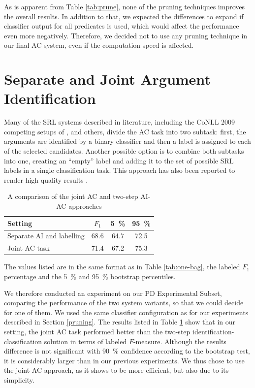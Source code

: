 \documentclass[12pt,notitlepage,a4paper]{report}
\begin{document}
As is apparent from Table \ref{tab:prune}, none of the pruning techniques improves the overall results. In addition to that, we expected the differences to expand if classifier output for all predicates is used, which would affect the performance even more negatively. Therefore, we decided not to use any pruning technique in our final AC system, even if the computation speed is affected.

\section{Separate and Joint Argument Identification}\label{ai-ac}

Many of the SRL systems described in literature, including the CoNLL 2009 competing setups of \citet{chen09}, \citet{bohnet09} and others, divide the AC task into two subtask: first, the arguments are identified by a binary classifier and then a label is assigned to each of the selected candidates. Another possible option is to combine both subtasks into one, creating an ``empty'' label and adding it to the set of possible SRL labels in a single classification task. This approach has also been reported to render high quality results \citep{che09,asahara09}.

\begin{table}[htb]\label{tab:ai-ac}
\caption{A comparison of the joint AC and two-step AI-AC approaches}\footnotesize
\begin{center}
\begin{tabular}{|l|c|c|c|}\hline
\bf Setting & $F_1$ & \bf 5~\% & \bf 95~\% \\\hline
Separate AI and labelling & 68.6 & 64.7 & 72.5 \\
Joint AC task & 71.4 & 67.2 & 75.3 \\\hline
\end{tabular}
\end{center}
The values listed are in the same format as in Table \ref{tab:one-bag}, the labeled $F_1$ percentage and the 5~\% and 95~\% bootstrap percentiles.
\end{table}

We therefore conducted an experiment on our PD Experimental Subset, comparing the performance of the two system variants, so that we could decide for one of them. We used the same classifier configuration as for our experiments described in Section \ref{pruning}. The results listed in Table \ref{tab:ai-ac} show that in our setting, the joint AC task performed better than the two-step identification-classification solution in terms of labeled $F$-measure. Although the results difference is not significant with 90~\% confidence according to the bootstrap test, it is considerably larger than in our previous experiments. We thus chose to use the joint AC approach, as it shows to be more efficient, but also due to its simplicity.
\end{document}
